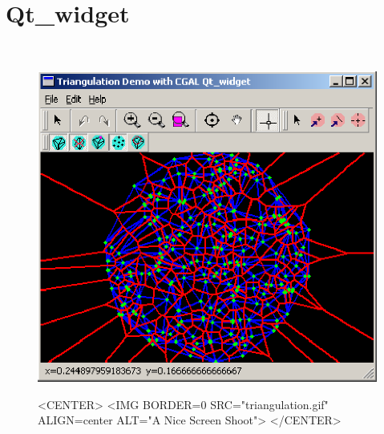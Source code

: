 
\newcommand{\cgalqt}{{\em Qt}}      %

\gdef\lciIfHtmlClassLinks{\lcFalse}
\gdef\lciIfHtmlRefLinks{\lcFalse}
\gdef\lciIfHtmlLinks{\lcFalse}

\chapter{Qt\_widget}
\label{chapterQtwidget}

\\


\begin{figure}[h]
\begin{ccTexOnly}
\begin{center}
\includegraphics{triangulation.eps} 
\end{center}
\end{ccTexOnly}
\begin{ccHtmlOnly}
<CENTER>
<IMG BORDER=0 SRC="triangulation.gif"  ALIGN=center  ALT="A Nice Screen Shoot">
</CENTER>
\end{ccHtmlOnly}
\end{figure}


